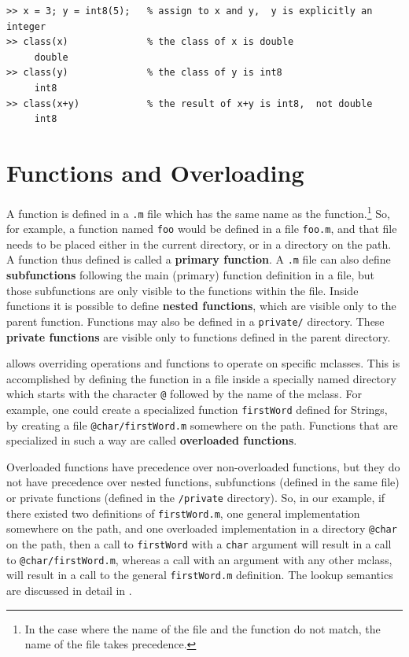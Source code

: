 \begin{lstlisting}
>> x = 3; y = int8(5);   % assign to x and y,  y is explicitly an integer
>> class(x)              % the class of x is double
     double
>> class(y)              % the class of y is int8
     int8
>> class(x+y)            % the result of x+y is int8,  not double
     int8
\end{lstlisting}




\section{\matlab Functions and Overloading}
\label{sec:functions}

A \matlab function is defined in a \texttt{.m} file which has the same name as
the function.\footnote{In the case where the name of the file and the function
do not match, the name of the file takes precedence.} So, for example,  a
function named \texttt{foo} would be defined in a file \texttt{foo.m},  and
that file needs to be placed either in the current directory, or in a directory
on the \matlab path. A function thus defined is called a \textbf{primary function}.
A \texttt{.m} file can also define \textbf{subfunctions}
following the main (primary) function definition in a file,  but those
subfunctions are only visible to the functions within the file.
Inside functions it is possible to define \textbf{nested functions},
which are visible only to the parent function.
Functions may also be defined in a \texttt{private/}
directory. These \textbf{private functions} are visible only to
functions defined in the parent directory.

\matlab allows overriding operations and functions to
operate on specific mclasses.  This is accomplished by defining the
function in a file inside a specially named directory which starts with
the character \texttt{@} followed by the name of the mclass.  For
example, one could create a specialized function \texttt{firstWord}
defined for Strings, by creating a file {\tt @char/firstWord.m}
somewhere on the \matlab path. Functions that are specialized in such a
way are called \textbf{overloaded functions}.


Overloaded functions have precedence over non-overloaded functions, but they do not have
precedence over nested functions, subfunctions (defined in the same file)
or private functions (defined in the \texttt{/private} directory).  So,
in our example, if there existed two definitions of {\tt firstWord.m},
one general implementation somewhere on the \matlab path, and one
overloaded implementation in a directory \texttt{@char} on the \matlab
path,  then a call to {\tt firstWord} with a {\tt char} argument will
result in a call to {\tt @char/firstWord.m}, whereas a call with an
argument with any other mclass,  will result in a call to the general
{\tt firstWord.m} definition. The lookup semantics are discussed in detail in .

